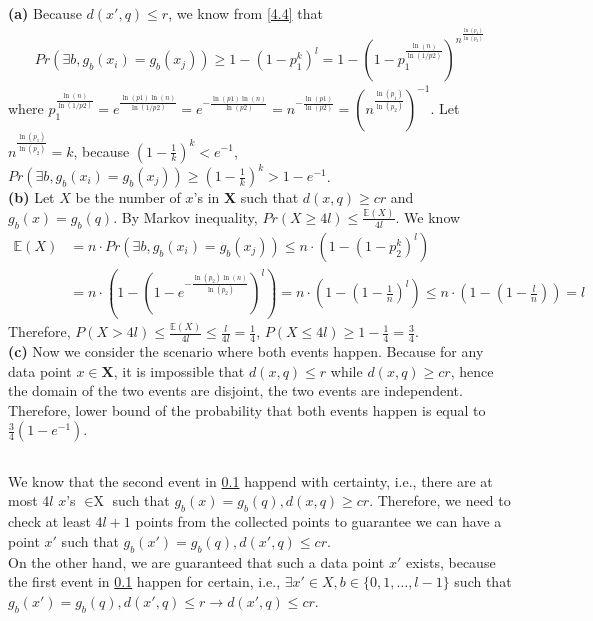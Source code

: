 \documentclass{article}
\begin{document}
        \subsection{}\label{4.5}
        \textbf{(a)} Because $d(x', q)\leq r$, we know from \ref{4.4} that 
        \begin{align*}
            Pr(\exists b, g_b(x_i)=g_b(x_j))\geq 1 - (1-p_1^k)^l=1-(1-p_1^{\frac{\ln(n)}{\ln(1/p2)}})^{n^{\frac{\ln(p_1)}{\ln(p_2)}}}
        \end{align*}
        where $p_1^{\frac{\ln(n)}{\ln(1/p2)}}=e^{\frac{\ln(p1)\ln(n)}{\ln(1/p2)}}=e^{-\frac{\ln(p1)\ln(n)}{\ln(p2)}}=n^{-\frac{\ln(p1)}{\ln(p2)}}=(n^{\frac{\ln(p_1)}{\ln(p_2)}})^{-1}$.
        Let $n^{\frac{\ln(p_1)}{\ln(p_2)}}=k$, because $(1-\frac{1}{k})^k<e^{-1}$, $Pr(\exists b, g_b(x_i)=g_b(x_j))\geq(1-\frac{1}{k})^k>1-e^{-1}$.\\
        \textbf{(b)} Let $X$ be the number of $x$'s in \textbf{X} such that $d(x,q)\geq cr$ and $g_b(x)=g_b(q)$. By Markov inequality, $Pr(X\geq 4l)\leq \frac{\mathbb{E}(X)}{4l}$.
        We know 
        \begin{align*}
            \mathbb{E}(X)&=n\cdot Pr(\exists b, g_b(x_i)=g_b(x_j))\leq n\cdot\left(1-(1-p_2^k)^l\right)\\
            &=n\cdot\left(1-(1-e^{-\frac{\ln(p_2)\ln(n)}{\ln(p_2)}})^l\right)=n\cdot\left(1-(1-\frac{1}{n})^l\right)\leq n\cdot(1-(1-\frac{l}{n}))=l
        \end{align*}
        Therefore, $P(X>4l)\leq \frac{\mathbb{E}(X)}{4l}\leq \frac{l}{4l}=\frac{1}{4}$, $P(X\leq 4l)\geq 1-\frac{1}{4}=\frac{3}{4}$.\\
        \textbf{(c)} Now we consider the scenario where both events happen. Because for any data point $x\in \textbf{X}$, it is impossible that $d(x,q)\leq r$ while $d(x,q)\geq cr$,
        hence the domain of the two events are disjoint, the two events are independent.
        Therefore, lower bound of the probability that both events happen is equal to $\frac{3}{4}(1-e^{-1})$.

        \subsection{}
        We know that the second event in \ref{4.5} happend with certainty, i.e., there are at most $4l$ $x$'s $\in\text{X}$ such that 
        $g_b(x)=g_b(q),d(x,q)\geq cr$. Therefore, we need to check at least $4l+1$ points from the collected points to guarantee we can have a point $x'$ such that
        $g_b(x')=g_b(q),d(x',q)\leq cr$.\\
        On the other hand, we are guaranteed that such a data point $x'$ exists, because the first event in \ref{4.5} happen for certain,
        i.e., $\exists x'\in X, b\in\{0,1,\dots,l-1\}$ such that $g_b(x')=g_b(q), d(x',q)\leq r\rightarrow d(x',q)\leq cr$.
        
\end{document}
